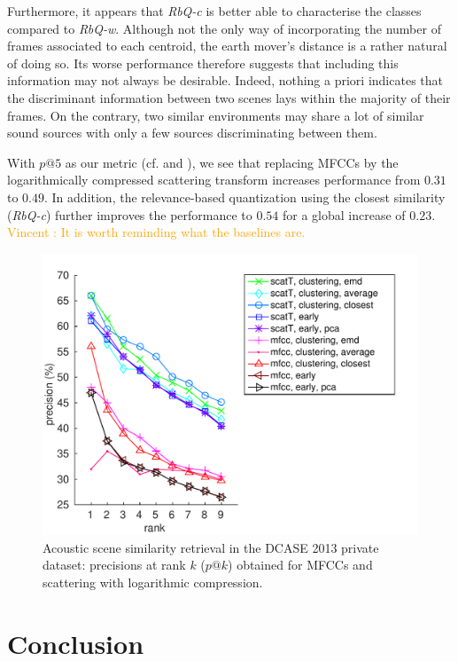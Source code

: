 \documentclass[smallextended]{svjour3}
\newcommand{\vl}[1]{\textcolor{orange}{Vincent : #1}}
\begin{document}
Furthermore, it appears that \emph{RbQ-c} is better able to characterise the classes compared to \emph{RbQ-w}. Although not the only way of incorporating the number of frames associated to each centroid, the earth mover's distance is a rather natural of doing so. Its worse performance therefore suggests that including this information may not always be desirable. Indeed, nothing a priori indicates that the discriminant information between two scenes lays within the majority of their frames. On the contrary, two similar environments may share a lot of similar sound sources with only a few sources discriminating between them.

With $p@5$ as our metric (cf. \cite{aucouturier2007bag} and \cite{lagrange:hal-01082501}), we see that replacing MFCCs by the logarithmically compressed scattering transform increases performance from $0.31$ to $0.49$. In addition, the relevance-based quantization using the closest similarity (\emph{RbQ-c}) further improves the performance to $0.54$ for a global increase of $0.23$. \vl{It is worth reminding what the baselines are.}

\begin{figure}[t]
\begin{center}
\includegraphics[width=\columnwidth]{figures/overall}
\caption{Acoustic scene similarity retrieval in the DCASE 2013 private dataset: precisions at rank $k$ ($p@k$) obtained for MFCCs and scattering with logarithmic compression.}
\label{fig:ASS_1}
\end{center}
\end{figure}

\section{Conclusion}
\end{document}
